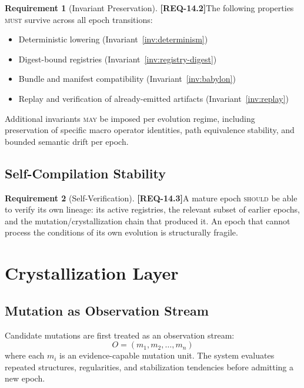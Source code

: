 \documentclass[11pt,a4paper,twoside]{article}
\theoremstyle{definition}
\newtheorem{requirement}{Requirement}[section]
\theoremstyle{remark}
\newcommand{\req}[1]{\textbf{\textcolor{reqred}{[REQ-#1]}}}
\newcommand{\must}{\textsc{must}}
\newcommand{\should}{\textsc{should}}
\newcommand{\may}{\textsc{may}}
\begin{document}
\begin{requirement}[Invariant Preservation]
\label{req:invariant-preservation}
\req{14.2}\quad The following properties \must{} survive across all epoch transitions:
\begin{itemize}[nosep]
  \item Deterministic lowering (Invariant~\ref{inv:determinism})
  \item Digest-bound registries (Invariant~\ref{inv:registry-digest})
  \item Bundle and manifest compatibility (Invariant~\ref{inv:babylon})
  \item Replay and verification of already-emitted artifacts (Invariant~\ref{inv:replay})
\end{itemize}
Additional invariants \may{} be imposed per evolution regime, including preservation of specific macro operator identities, path equivalence stability, and bounded semantic drift per epoch.
\end{requirement}

\subsection{Self-Compilation Stability}

\begin{requirement}[Self-Verification]
\label{req:self-verify}
\req{14.3}\quad A mature epoch \should{} be able to verify its own lineage: its active registries, the relevant subset of earlier epochs, and the mutation/crystallization chain that produced it. An epoch that cannot process the conditions of its own evolution is structurally fragile.
\end{requirement}



\section{Crystallization Layer}
\label{sec:crystallization}

\subsection{Mutation as Observation Stream}

Candidate mutations are first treated as an observation stream:
\[
  O = (m_1, m_2, \ldots, m_n)
\]
where each $m_i$ is an evidence-capable mutation unit. The system evaluates repeated structures, regularities, and stabilization tendencies before admitting a new epoch.
\end{document}
